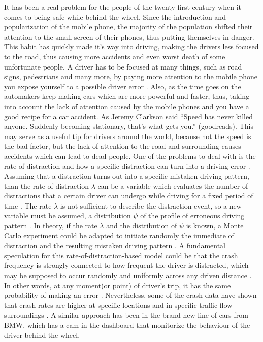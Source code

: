 It has been a real problem for the people of the twenty-first century when it comes to being safe while behind the wheel. Since the introduction and popularization of the mobile phone, the majority of the population shifted their attention to the small screen of their phones, thus putting themselves in danger. This habit has quickly made it's way into driving, making the drivers less focused to the road, thus causing more accidents and even worst death of some unfortunate people. A driver has to be focused at many things, such as road signs, pedestrians and many more, by paying more attention to the mobile phone you expose yourself to a possible driver error \cite{trafficConflict}. Also, as the time goes on the automakers keep making cars which are more powerful and faster, thus, taking into account the lack of attention caused by the mobile phones and you have a good recipe for a car accident. As Jeremy Clarkson said “Speed has never killed anyone. Suddenly becoming stationary, that's what gets you.” (goodreads). This may serve as a useful tip for drivers around the world, because not the speed is the bad factor, but the lack of attention to the road and surrounding causes accidents which can lead to dead people.    
\newline
One of the problems to deal with is the rate of distraction and how a specific distraction can turn into a driving error \cite{trafficConflict}. Assuming that a distraction turns out into a specific mistaken driving pattern, than the rate of distraction \ensuremath{\lambda} can be a variable which evaluates the number of distractions that a certain driver can undergo while driving for a fixed period of time \cite{trafficConflict}. The rate \ensuremath{\lambda} is not sufficient to describe the distraction event, so a new variable must be assumed, a distribution \ensuremath{\psi} of the profile of erroneous driving pattern \cite{trafficConflict}. In theory, if the rate \ensuremath{\lambda} and the distribution of \ensuremath{\psi} is known, a Monte Carlo experiment could be adapted to initiate randomly the immediate of distraction and the resulting mistaken driving pattern \cite{trafficConflict}. 
\newline
A fundamental speculation for this rate-of-distraction-based model could be  that the crash frequency is strongly connected to how frequent the driver is distracted, which may be supposed to occur randomly and uniformly across any driven distance \cite{trafficConflict}. In other words, at any moment(or point) of driver's trip, it has the same probability of making an error \cite{trafficConflict}. Nevertheless, some of the crash data have shown that crash rates are higher at specific locations and in specific traffic flow surroundings \cite{trafficConflict}.
\newline
A similar approach has been in the brand new line of cars from BMW, which has a cam in the dashboard that monitorize the behaviour of the driver behind the wheel.
\newpage